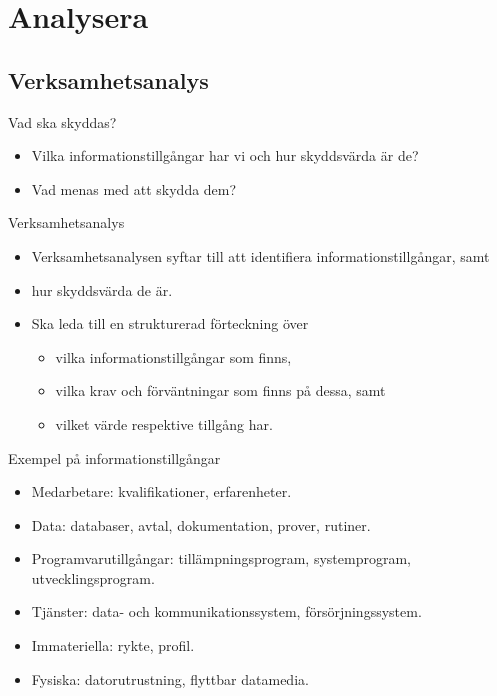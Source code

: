 \documentclass{beamer}
\begin{document}
\section{Analysera}

\subsection{Verksamhetsanalys}

\begin{frame}{Vad ska skyddas?}
  \begin{itemize}
    \item Vilka informationstillgångar har vi och hur skyddsvärda är de?
    \item Vad menas med att skydda dem?
  \end{itemize}
\end{frame}

\begin{frame}{Verksamhetsanalys}
  \begin{itemize}
    \item Verksamhetsanalysen syftar till att identifiera 
      informationstillgångar, samt

    \item hur skyddsvärda de är.

    \item Ska leda till en strukturerad förteckning över
      \begin{itemize}
        \item vilka informationstillgångar som finns,
        \item vilka krav och förväntningar som finns på dessa, samt
        \item vilket värde respektive tillgång har.
      \end{itemize}

  \end{itemize}
\end{frame}

\begin{frame}{Exempel på informationstillgångar}
  \begin{itemize}
    \item Medarbetare: kvalifikationer, erfarenheter.
    \item Data: databaser, avtal, dokumentation, prover, rutiner.
    \item Programvarutillgångar: tillämpningsprogram, systemprogram, 
      utvecklingsprogram.
    \item Tjänster: data- och kommunikationssystem, försörjningssystem.
    \item Immateriella: rykte, profil.
    \item Fysiska: datorutrustning, flyttbar datamedia.
  \end{itemize}
\end{frame}
\end{document}
